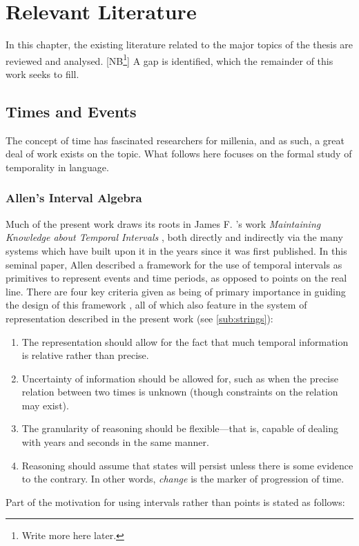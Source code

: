 \documentclass[a4paper,12pt,leqno]{article}
\newcommand{\selfnote}[1]{{\color{red}[NB\footnote{{\color{red}#1}}]}}
\newcommand{\nb}{\selfnote}
\begin{document}
\section{Relevant Literature}\label{sec:litreview}
In this chapter, the existing literature related to the major topics of the thesis are reviewed and analysed. \nb{Write more here later.} A gap is identified, which the remainder of this work seeks to fill.
\subsection{Times and Events}\label{sub:timesevents}
The concept of time has fascinated researchers for millenia, and as such, a great deal of work exists on the topic. What follows here focuses on the formal study of temporality in language.
\subsubsection{Allen's Interval Algebra}\label{ssub:allen}
Much of the present work draws its roots in James F. \citeauthor{allen1983maintaining}'s work \textit{Maintaining Knowledge about Temporal Intervals} \citeyearpar{allen1983maintaining}, both directly and indirectly via the many systems which have built upon it in the years since it was first published. In this seminal paper, Allen described a framework for the use of temporal intervals as primitives to represent events and time periods, as opposed to points on the real line. There are four key criteria given as being of primary importance in guiding the design of this framework \citeyearpar[p. 833]{allen1983maintaining}, all of which also feature in the system of representation described in the present work (see \cref{sub:strings}):
\begin{enumerate}
\onehalfspacing
\item The representation should allow for the fact that much temporal information is relative rather than precise.
\item Uncertainty of information should be allowed for, such as when the precise relation between two times is unknown (though constraints on the relation may exist).
\item The granularity of reasoning should be flexible---that is, capable of dealing with years and seconds in the same manner.
\item Reasoning should assume that states will persist unless there is some evidence to the contrary. In other words, \textit{change} is the marker of progression of time. 
\end{enumerate}
Part of the motivation for using intervals rather than points is stated as follows:
\end{document}
